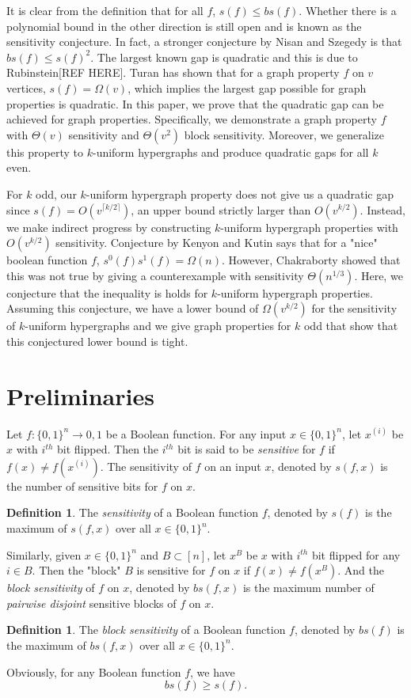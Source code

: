 \documentclass[psamsfonts]{amsart}
\theoremstyle{definition}
\newtheorem{defn}[theorem]{Definition}
\theoremstyle{remark}
\numberwithin{equation}{section}
\begin{document}
It is clear from the definition that for all $f$, $s(f) \leq bs(f)$.  Whether there is a polynomial bound in the other direction is still open and is known as the sensitivity conjecture. In fact, a stronger conjecture by Nisan and Szegedy is that $bs(f) \leq s(f)^{2}$. The largest known gap is quadratic and this is due to Rubinstein[REF HERE]. Turan has shown that for a graph property $f$ on $v$ vertices, $s(f) = \Omega(v)$, which implies the largest gap possible for graph properties is quadratic. In this paper, we prove that the quadratic gap can be achieved for graph properties. Specifically, we demonstrate a graph property $f$ with $\Theta(v)$ sensitivity and $\Theta(v^2)$ block sensitivity. Moreover, we generalize this property to $k$-uniform hypergraphs and produce quadratic gaps for all $k$ even.

	For $k$ odd, our $k$-uniform hypergraph property does not give us a quadratic gap since $s(f) = O(v^{\lceil k/2 \rceil})$, an upper bound strictly larger than $O(v^{k/2})$. Instead, we make indirect progress by constructing $k$-uniform hypergraph properties with $O(v^{k/2})$ sensitivity. Conjecture by Kenyon and Kutin says that for a "nice" boolean function $f$, $s^0(f)s^1(f) = \Omega(n)$. However, Chakraborty showed that this was not true by giving a counterexample with sensitivity $\Theta(n^{1/3})$. Here, we conjecture that the inequality is holds for $k$-uniform hypergraph properties. Assuming this conjecture, we have a lower bound of $\Omega(v^{k/2})$ for the sensitivity of $k$-uniform hypergraphs and we give graph properties for $k$ odd that show that this conjectured lower bound is tight.

	\section{Preliminaries}
		Let $f: \{0,1\}^n \to {0,1}$ be a Boolean function. For any input $x \in \{0,1 \}^n$, let $x^{(i)}$ be $x$ with $i^{th}$ bit flipped. Then the $i ^ {th}$ bit is said to be \textit{sensitive} for $f$ if $f(x) \neq f(x^{(i)})$. The sensitivity of $f$ on an input $x$, denoted by $s(f,x)$ is the number of sensitive bits for $f$ on $x$.
		\begin{defn}
			The \textit{sensitivity} of a Boolean function $f$, denoted by $s(f)$ is the maximum of $s(f,x)$ over all $x \in \{0,1\}^n$.
		\end{defn}
		Similarly, given $x \in \{0,1\}^n$ and $B \subset [n]$, let $x^{B}$ be $x$ with $i^{th}$ bit flipped for any $i \in B$. Then the "block" $B$ is sensitive for $f$ on $x$ if $f(x) \neq f(x^B)$. And the \textit{block sensitivity} of $f$ on $x$, denoted by $bs(f,x)$ is the maximum number of \textit{pairwise disjoint} sensitive blocks of $f$ on $x$.
		\begin{defn}
			The \textit{block sensitivity} of a Boolean function $f$, denoted by $bs(f)$ is the maximum of $bs(f,x)$ over all $x \in \{0,1\}^n$.
		\end{defn}
		Obviously, for any Boolean function $f$, we have 
		\begin{equation}
			bs(f) \geq s(f). \nonumber
		\end{equation}
		
\end{document}
